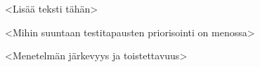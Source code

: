 <Lisää teksti tähän>

<Mihin suuntaan testitapausten priorisointi on menossa>

<Menetelmän järkevyys ja toistettavuus>